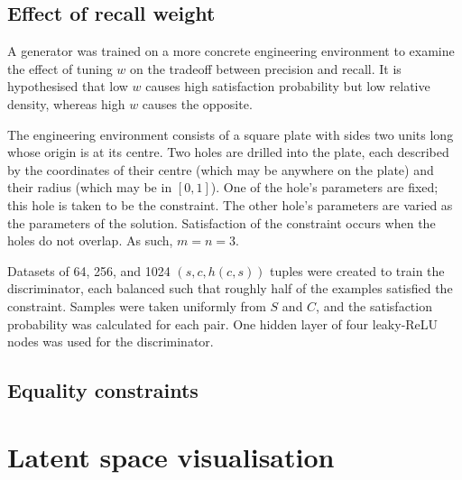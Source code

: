 \documentclass[../../main.tex]{subfiles}
\begin{document}
\subsection{Effect of recall weight}

A generator was trained on a more concrete engineering environment to examine the effect of tuning $w$ on the tradeoff between precision and recall.
It is hypothesised that low $w$ causes high satisfaction probability but low relative density, whereas high $w$ causes the opposite.

The engineering environment consists of a square plate with sides two units long whose origin is at its centre.
Two holes are drilled into the plate, each described by the coordinates of their centre (which may be anywhere on the plate) and their radius (which may be in $[0,1]$).
One of the hole's parameters are fixed; this hole is taken to be the constraint.
The other hole's parameters are varied as the parameters of the solution.
Satisfaction of the constraint occurs when the holes do not overlap.
As such, $m=n=3$.

Datasets of 64, 256, and 1024 $(s,c,h(c,s))$ tuples were created to train the discriminator, each balanced such that roughly half of the examples satisfied the constraint.
Samples were taken uniformly from $S$ and $C$, and the satisfaction probability was calculated for each pair.
One hidden layer of four leaky-ReLU nodes was used for the discriminator.

\subsection{Equality constraints}

\section{Latent space visualisation}
\end{document}
